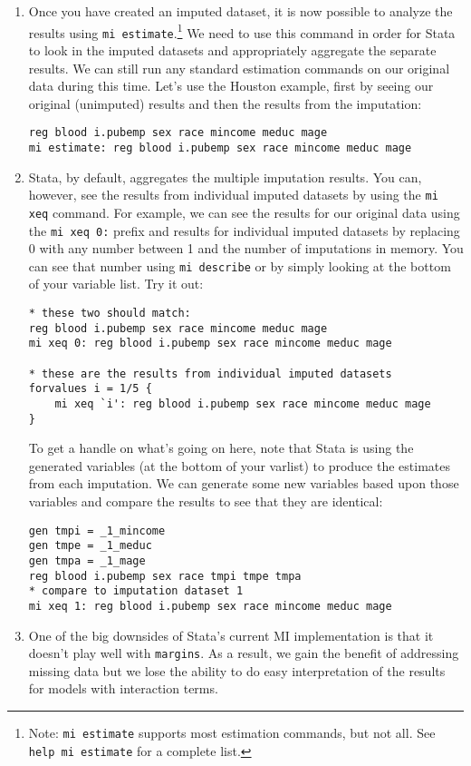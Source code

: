 \documentclass[a4paper,12pt]{article}
\begin{document}
\begin{enumerate}
\item Once you have created an imputed dataset, it is now possible to analyze the results using \texttt{mi estimate}.\footnote{Note: \texttt{mi estimate} supports most estimation commands, but not all. See \texttt{help mi estimate} for a complete list.} We need to use this command in order for Stata to look in the imputed datasets and appropriately aggregate the separate results. We can still run any standard estimation commands on our original data during this time. Let's use the Houston example, first by seeing our original (unimputed) results and then the results from the imputation:
\begin{verbatim}
reg blood i.pubemp sex race mincome meduc mage
mi estimate: reg blood i.pubemp sex race mincome meduc mage
\end{verbatim}

\item Stata, by default, aggregates the multiple imputation results. You can, however, see the results from individual imputed datasets by using the \texttt{mi xeq} command. For example, we can see the results for our original data using the \texttt{mi xeq 0:} prefix and results for individual imputed datasets by replacing 0 with any number between 1 and the number of imputations in memory. You can see that number using \texttt{mi describe} or by simply looking at the bottom of your variable list. Try it out:
\begin{verbatim}
* these two should match:
reg blood i.pubemp sex race mincome meduc mage
mi xeq 0: reg blood i.pubemp sex race mincome meduc mage

* these are the results from individual imputed datasets
forvalues i = 1/5 {
	mi xeq `i': reg blood i.pubemp sex race mincome meduc mage
}
\end{verbatim}

To get a handle on what's going on here, note that Stata is using the generated variables (at the bottom of your varlist) to produce the estimates from each imputation. We can generate some new variables based upon those variables and compare the results to see that they are identical:

\begin{verbatim}
gen tmpi = _1_mincome
gen tmpe = _1_meduc
gen tmpa = _1_mage
reg blood i.pubemp sex race tmpi tmpe tmpa
* compare to imputation dataset 1
mi xeq 1: reg blood i.pubemp sex race mincome meduc mage
\end{verbatim}

\item One of the big downsides of Stata's current MI implementation is that it doesn't play well with \texttt{margins}. As a result, we gain the benefit of addressing missing data but we lose the ability to do easy interpretation of the results for models with interaction terms.


\end{enumerate}
\end{document}
